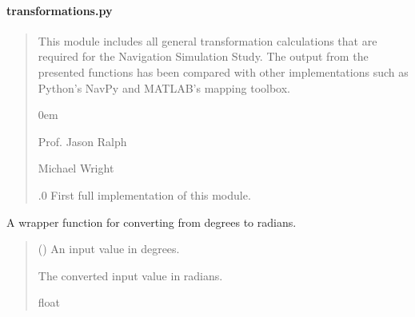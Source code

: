 \documentclass[letterpaper,10pt,english]{sphinxmanual}
\begin{document}
\paragraph{transformations.py}
\label{\detokenize{modules/util/transformations:transformations-py}}\begin{quote}\begin{description}
\sphinxAtStartPar
This module includes all general transformation calculations that
are required for the Navigation Simulation Study. The output from the
presented functions has been compared with other implementations such as
Python’s NavPy and MATLAB’s mapping toolbox.

\begin{DUlineblock}{0em}
\item[] Prof. Jason Ralph \sphinxhyphen{} 
\item[] Michael Wright \sphinxhyphen{} 
\end{DUlineblock}

.0 \sphinxhyphen{} First full implementation of this module.

\end{description}\end{quote}

\begin{fulllineitems}
\label{\detokenize{modules/util/transformations:qnav.util.transformations.deg2rad}}
\pysigstartsignatures
{}
\pysigstopsignatures
\sphinxAtStartPar
A wrapper function for converting from degrees to radians.
\begin{quote}\begin{description}
\sphinxAtStartPar
{} () \textendash{} An input value in degrees.

\sphinxAtStartPar
The converted input value in radians.

\sphinxAtStartPar
float

\end{description}\end{quote}

\end{fulllineitems}
\end{document}
